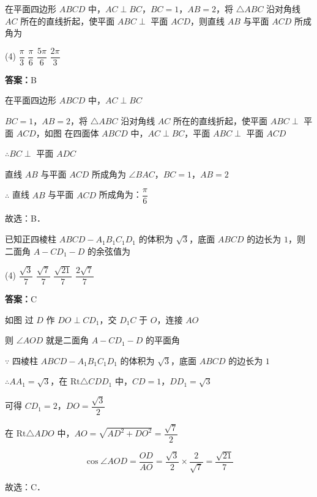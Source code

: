 \begin{example}[\bkstar{3}{5}]
在平面四边形 $ABCD$ 中，$AC\perp BC$，$BC=1$，$AB=2$，将 $\triangle ABC$ 沿对角线 $AC$ 所在的直线折起，使平面 $ABC\perp$ 平面 $ACD$，则直线 $AB$ 与平面 $ACD$ 所成角为
\begin{tasks}(4)
    \task $\dfrac{\pi}{3}$
    \task $\dfrac{\pi}{6}$
    \task $\dfrac{5\pi}{6}$
    \task $\dfrac{2\pi}{3}$
\end{tasks}
\end{example}
\begin{solution}
\textbf{答案：}B

在平面四边形 $ABCD$ 中，$AC\perp BC$

$BC=1$，$AB=2$，将 $\triangle ABC$ 沿对角线 $AC$ 所在的直线折起，使平面 $ABC\perp$ 平面 $ACD$，如图
在四面体 $ABCD$ 中，$AC\perp BC$，平面 $ABC\perp$ 平面 $ACD$

$\therefore BC\perp$ 平面 $ADC$

直线 $AB$ 与平面 $ACD$ 所成角为 $\angle BAC$，$BC=1$，$AB=2$

$\therefore$ 直线 $AB$ 与平面 $ACD$ 所成角为：$\dfrac{\pi}{6}$

故选：B．
\end{solution}

\vspace{2em}


\begin{example}[\bkstar{3}{5}]
已知正四棱柱 $ABCD-A_1B_1C_1D_1$ 的体积为 $\sqrt{3}$，底面 $ABCD$ 的边长为 $1$，则二面角 $A-CD_1-D$ 的余弦值为
\begin{tasks}(4)
    \task $\dfrac{\sqrt{3}}{7}$
    \task $\dfrac{\sqrt{7}}{7}$
    \task $\dfrac{\sqrt{21}}{7}$
    \task $\dfrac{2\sqrt{7}}{7}$
\end{tasks}
\end{example}
\begin{solution}
\textbf{答案：}C

如图
过 $D$ 作 $DO\perp CD_1$，交 $D_1C$ 于 $O$，连接 $AO$

则 $\angle AOD$ 就是二面角 $A-CD_1-D$ 的平面角

$\because$ 四棱柱 $ABCD-A_1B_1C_1D_1$ 的体积为 $\sqrt{3}$，底面 $ABCD$ 的边长为 $1$

$\therefore AA_1=\sqrt{3}$，在 $\mathrm{Rt}\triangle CDD_1$ 中，$CD=1$，$DD_1=\sqrt{3}$

可得 $CD_1=2$，$DO=\dfrac{\sqrt{3}}{2}$

在 $\mathrm{Rt}\triangle ADO$ 中，$AO=\sqrt{AD^2+DO^2}=\dfrac{\sqrt{7}}{2}$

$$
\cos\angle AOD=\dfrac{OD}{AO}=\dfrac{\sqrt{3}}{2}\times\dfrac{2}{\sqrt{7}}=\dfrac{\sqrt{21}}{7}
$$

故选：C．
\end{solution}
